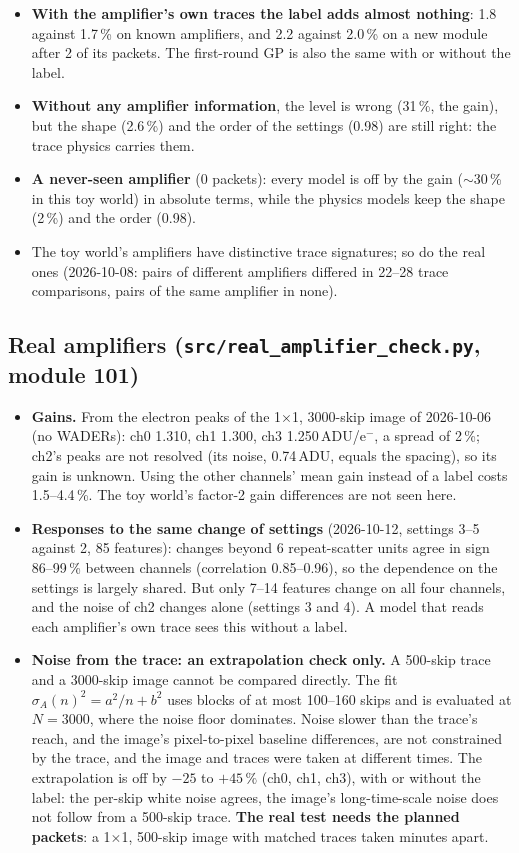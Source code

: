 \documentclass[10pt]{article}
\newcommand{\code}[1]{\texttt{#1}}
\begin{document}
\begin{itemize}
\item \textbf{With the amplifier's own traces the label adds almost nothing}: 1.8 against 1.7\,\% on known amplifiers, and 2.2 against
  2.0\,\% on a new module after 2 of its packets. The first-round GP is also the same with or without the label.
\item \textbf{Without any amplifier information}, the level is wrong (31\,\%, the gain), but the shape (2.6\,\%) and the order of the settings
  (0.98) are still right: the trace physics carries them.
\item \textbf{A never-seen amplifier} (0 packets): every model is off by the gain ($\sim$30\,\% in this toy world) in absolute terms, while the
  physics models keep the shape (2\,\%) and the order (0.98).
\item The toy world's amplifiers have distinctive trace signatures; so do the real ones (2026-10-08: pairs of different amplifiers differed in
  22--28 trace comparisons, pairs of the same amplifier in none).
\end{itemize}

\subsection{Real amplifiers (\code{src/real\_amplifier\_check.py}, module 101)}
\begin{itemize}
\item \textbf{Gains.} From the electron peaks of the 1$\times$1, 3000-skip image of 2026-10-06 (no WADERs): ch0 1.310, ch1 1.300, ch3
  1.250\,ADU/e$^-$, a spread of 2\,\%; ch2's peaks are not resolved (its noise, 0.74\,ADU, equals the spacing), so its gain is unknown.
  Using the other channels' mean gain instead of a label costs 1.5--4.4\,\%. The toy world's factor-2 gain differences are not seen here.
\item \textbf{Responses to the same change of settings} (2026-10-12, settings 3--5 against 2, 85 features): changes beyond 6 repeat-scatter
  units agree in sign 86--99\,\% between channels (correlation 0.85--0.96), so the dependence on the settings is largely shared. But
  only 7--14 features change on all four channels, and the noise of ch2 changes alone (settings 3 and 4). A model that reads each
  amplifier's own trace sees this without a label.
\item \textbf{Noise from the trace: an extrapolation check only.} A 500-skip trace and a 3000-skip image cannot be compared directly.
  The fit $\sigma_A(n)^2 = a^2/n + b^2$ uses blocks of at most 100--160 skips and is evaluated at $N = 3000$, where the noise floor
  dominates. Noise slower than the trace's reach, and the image's pixel-to-pixel baseline differences, are not constrained by the
  trace, and the image and traces were taken at different times. The extrapolation is off by $-25$ to $+45\,\%$ (ch0, ch1, ch3), with
  or without the label: the per-skip white noise agrees, the image's long-time-scale noise does not follow from a 500-skip trace.
  \textbf{The real test needs the planned packets}: a 1$\times$1, 500-skip image with matched traces taken minutes apart.
\end{itemize}
\end{document}

